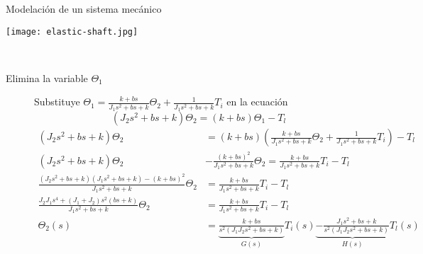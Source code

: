\documentclass[dvisvgm,hypertex,aspectratio=169]{beamer}
\begin{document}
  \begin{frame}[label=M2]{Modelación de un sistema mecánico}

    \begin{center}
      \texttt{[image: elastic-shaft.jpg]}
      \\
    \end{center}
    \scriptsize
    \begin{description}
    \item[Elimina la variable \(\Theta_1\)]
      Substituye \(\Theta_1 = \frac{k+bs}{J_1s^2 + bs + k}\Theta_2 + \frac{1}{J_1s^2 + bs + k}T_i\) 
      en la ecuación \[(J_2s^2 + bs + k)\Theta_2 = (k + bs) \Theta_1 - T_l\]
      {\tiny
      \begin{align*}
        (J_2s^2 + bs + k)\Theta_2 &= (k+bs) \left(\frac{k + bs}{J_1s^2 + bs + k} \Theta_2 + \frac{1}{J_1s^2 + bs + k}T_i\right) - T_l\\
        (J_2s^2 + bs + k)\Theta_2  &- \frac{(k+bs)^2}{J_1s^2 + bs + k}\Theta_2 = \frac{k+bs}{J_1s^2 + bs + k} T_i - T_l\\
        \frac{(J_2s^2 + bs +k)(J_1s^2 + bs + k) - (k+bs)^2}{J_1s^2 + bs + k} \Theta_2 &= \frac{k+bs}{J_1s^2 + bs + k} T_i - T_l\\
        \frac{J_2J_1s^4 + (J_1+J_2)s^2(bs +k)}{J_1s^2 + bs + k} \Theta_2 &= \frac{k+bs}{J_1s^2 + bs + k} T_i - T_l\\
        \Theta_2(s) &= \underbrace{\frac{k + bs}{s^2(J_1J_2s^2 + bs + k)}}_{G(s)}T_i(s) \underbrace{- \frac{J_1s^2 + bs + k}{s^2(J_1J_2s^2 + bs + k)}}_{H(s)}T_l(s)
      \end{align*}}
    \end{description}      
  \end{frame}
\end{document}
